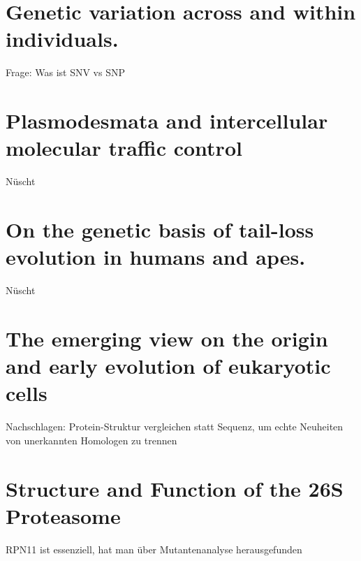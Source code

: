 \section{Genetic variation across and within individuals.}\label{sec:genetic-variation-across-and-within-individuals.}




Frage: Was ist SNV vs SNP






\section{Plasmodesmata and intercellular molecular traffic control}\label{sec:plasmodesmata-and-intercellular-molecular-traffic-control}
Nüscht

\section{On the genetic basis of tail-loss evolution in humans and apes.}\label{sec:on-the-genetic-basis-of-tail-loss-evolution-in-humans-and-apes.}
Nüscht



\section{The emerging view on the origin and early evolution of eukaryotic cells}\label{sec:begin-of-eukaryotic-cells-oder-so}
Nachschlagen: Protein-Struktur vergleichen statt Sequenz, um echte Neuheiten von unerkannten Homologen zu trennen

\section{Structure and Function of the 26S Proteasome}\label{sec:structure-and-function-of-the-26s-proteasome.}
RPN11 ist essenziell, hat man über Mutantenanalyse herausgefunden
